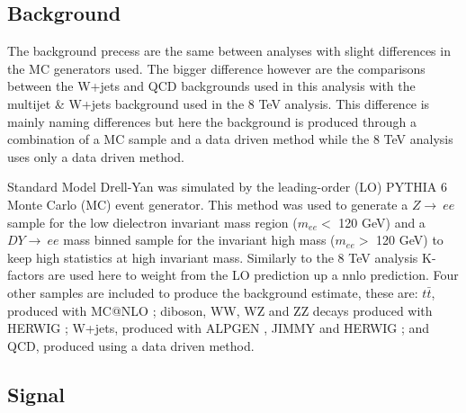 \subsection*{Background}

	The background precess are the same between analyses with slight differences in the MC generators used. The bigger difference however are the comparisons between the W+jets and QCD backgrounds used in this analysis with the multijet \& W+jets background used in the 8 TeV analysis. This difference is mainly naming differences but here the background is produced through a combination of a MC sample and a data driven method while the 8 TeV analysis uses only a data driven method. 

	Standard Model Drell-Yan was simulated by the leading-order (LO) PYTHIA 6 \cite{1126-6708-2006-05-026} Monte Carlo (MC) event generator. This method was used to generate a $Z\rightarrow~ee$ sample for the low dielectron invariant mass region ($m_{ee} <$ 120 GeV) and a $DY\rightarrow~ee$ mass binned sample for the invariant high mass ($m_{ee} >$ 120 GeV) to keep high statistics at high invariant mass. Similarly to the 8 TeV analysis K-factors are used here to weight from the LO prediction up a nnlo prediction. Four other samples are included to produce the background estimate, these are: $t\bar{t}$, produced with MC@NLO \cite{Frixione:2008ym}; diboson, WW, WZ and ZZ decays produced with HERWIG \cite{Corcella:2002jc}; W+jets, produced with ALPGEN \cite{Mangano:2002ea}, JIMMY \cite{Butterworth:1996zw} and HERWIG \cite{Corcella:2002jc}; and QCD, produced using a data driven method.

\subsection*{Signal} 

